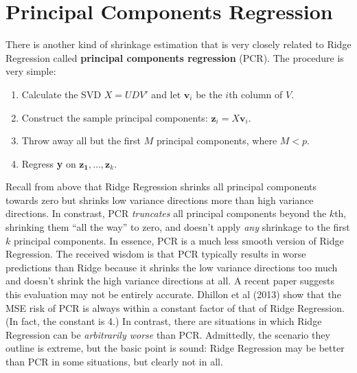 \documentclass[12pt]{article}
\theoremstyle{definition}
\begin{document}
\section{Principal Components Regression}
There is another kind of shrinkage estimation that is very closely related to Ridge Regression called \textbf{principal components regression} (PCR). The procedure is very simple:
	\begin{enumerate}
		\item Calculate the SVD $X=UDV'$ and let $\mathbf{v}_i$ be the $i$th column of $V$.
		\item Construct the sample principal components: $\mathbf{z}_i = X \mathbf{v}_i$.
		\item Throw away all but the first $M$ principal components, where $M <p$.
		\item Regress \textbf{y} on $\mathbf{z_1}, \hdots, \mathbf{z}_k$. 
	\end{enumerate}
Recall from above that Ridge Regression shrinks all principal components towards zero but shrinks low variance directions more than high variance directions. In constrast, PCR \emph{truncates} all principal components beyond the $k$th, shrinking them ``all the way'' to zero, and doesn't apply \emph{any} shrinkage to the first $k$ principal components. In essence, PCR is a much less smooth version of Ridge Regression. The received wisdom is that PCR typically results in worse predictions than Ridge because it shrinks the low variance directions too much and doesn't shrink the high variance directions at all. A recent paper suggests this evaluation may not be entirely accurate. Dhillon et al (2013) show that the MSE risk of PCR is always within a constant factor of that of Ridge Regression. (In fact, the constant is 4.) In contrast, there are situations in which Ridge Regression can be \emph{arbitrarily worse} than PCR. Admittedly, the scenario they outline is extreme, but the basic point is sound: Ridge Regression may be better than PCR in some situations, but clearly not in all. 
\end{document}
